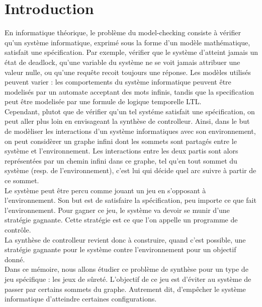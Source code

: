 \documentclass[12pt,a4paper,oneside,titlepage]{report}
\begin{document}

{}
\renewcommand{\leftmark}{TABLE DES MATI\`{E}RES}
\thispagestyle{fancy}
\tableofcontents


\newpage
{}
\renewcommand{\leftmark}{INTRODUCTION}
\chapter{Introduction}
En informatique théorique, le problème du model-checking consiste à vérifier qu'un système informatique, exprimé sous la forme d'un modèle mathématique, satisfait une spécification. Par exemple, vérifier que le système d'atteint jamais un état de deadlock, qu'une variable du système ne se voit jamais attribuer une valeur nulle, ou qu'une requête recoit toujours une réponse. Les modèles utilisés peuvent varier : les comportements du système informatique peuvent être modelisés par un automate acceptant des mots infinis, tandis que la specification peut être modelisée par une formule de logique temporelle LTL.\\
Cependant, plutot que de vérifier qu'un tel systéme satisfait une spécification, on peut aller plus loin en envisageant la synthèse de controlleur. Ainsi, dans le but de modèliser les interactions d'un système informatiques avec son environnement, on peut considèrer un graphe infini dont les sommets sont partagés entre le système et l'environnement. Les interactions entre les deux partis sont alors représentées par un chemin infini dans ce graphe, tel qu'en tout sommet du système (resp. de l'environnement), c'est lui qui décide quel arc suivre à partir de ce sommet.\\
Le système peut être percu comme jouant un jeu en s'opposant à l'environnement. Son but est de satisfaire la spécification, peu importe ce que fait l'environnement. Pour gagner ce jeu, le système va devoir se munir d'une stratégie gagnante. Cette stratégie est ce que l'on appelle un programme de contrôle.\\
La synthèse de controlleur revient donc à construire, quand c'est possible, une stratégie gagnante pour le système contre l'environnement pour un objectif donné.\\

\noindent Dans ce mémoire, nous allons étudier ce problème de synthèse pour un type de jeu spécifique : les jeux de sûreté. L'objectif de ce jeu est d'éviter au système de passer par certains sommets du graphe. Autrement dit, d'empêcher le système informatique d'atteindre certaines configurations.\\
\end{document}
